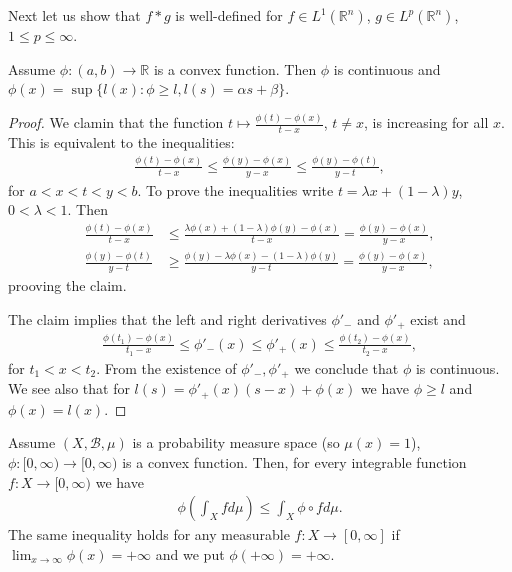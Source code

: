 Next let us show that \(f\ast g\) is well-defined for \(f\in L^1(\mathbb{R}^n)\), \(g\in L^p(\mathbb{R}^n)\), \(1\leq p \leq \infty\).

\begin{lemma}
    Assume \(\phi:(a,b)\rightarrow \mathbb{R}\) is a convex function. Then \(\phi\) is continuous and \(\phi(x) = \sup\{ l(x):\phi\geq l, l(s)=\alpha s+\beta \}\).
\end{lemma}
\ifdetailed
\begin{proof}
    We clamin that the function \(t\mapsto \frac{\phi(t)-\phi(x)}{t-x}\), \(t\neq x\), is increasing for all \(x\). This is equivalent to the inequalities:
    \begin{align*}
        \frac{\phi(t)-\phi(x)}{t-x} \leq \frac{\phi(y)-\phi(x)}{y-x}\leq \frac{\phi(y)-\phi(t)}{y-t},
    \end{align*}
    for \(a<x<t<y<b\). To prove the inequalities write \(t=\lambda x + (1-\lambda)y\), \(0<\lambda<1\). Then
    \begin{align*}
        \frac{\phi(t)-\phi(x)}{t-x} &\leq \frac{\lambda \phi(x) + (1-\lambda)\phi(y) - \phi(x)}{t-x} = \frac{\phi(y)-\phi(x)}{y-x}, \\
        \frac{\phi(y)-\phi(t)}{y-t} &\geq \frac{\phi(y) -\lambda\phi(x) - (1-\lambda)\phi(y)}{y-t} = \frac{\phi(y)-\phi(x)}{y-x},
    \end{align*}
    prooving the claim. 

    The claim implies that the left and right derivatives \(\phi'_{-}\) and \(\phi'_{+}\) exist and
    \begin{align*}
        \frac{\phi(t_1)-\phi(x)}{t_1-x} \leq \phi'_{-}(x)\leq \phi'_{+}(x) \leq \frac{\phi(t_2) -\phi(x)}{t_2 - x},
    \end{align*}    
    for \(t_1<x<t_2\). From the existence of \(\phi'_{-},\phi'_{+}\) we conclude that \(\phi\) is continuous. We see also that for \(l(s)=\phi'_{+}(x)(s-x) + \phi(x)\) we have \(\phi\geq l\) and \(\phi(x) = l(x)\).
\end{proof}
\fi 
\begin{theorem}
    Assume \((X,\mathscr{B}, \mu)\) is a probability measure space (so \(\mu(x)=1\)), \(\phi:[0,\infty) \rightarrow [0,\infty)\) is a convex function. Then, for every integrable function \(f:X\rightarrow[0,\infty)\) we have 
    \begin{align*}
        \phi\left(\int_X fd\mu\right) \leq \int_X \phi\circ f d\mu.
    \end{align*}
    The same inequality holds for any measurable \(f:X\rightarrow [0,\infty]\) if \(\lim_{x\rightarrow\infty}\phi(x) = +\infty \) and we put \(\phi(+\infty) = +\infty\).
\end{theorem}
